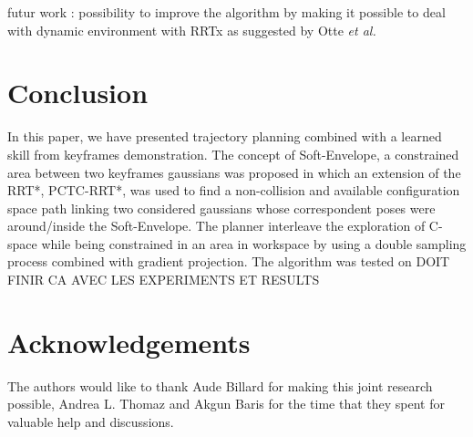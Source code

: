 \documentclass[letterpaper, 10 pt, conference]{ieeeconf}  %
\begin{document}
futur work : possibility to improve the algorithm by making it possible to deal with dynamic environment with RRTx as suggested by Otte \textit{et al.} \cite{RRTx}

\section{Conclusion}
In this paper, we have presented trajectory planning combined with a learned skill from keyframes demonstration. The concept of Soft-Envelope, a constrained area between two keyframes gaussians was proposed in which an extension of the RRT*, PCTC-RRT*, was used to find a non-collision and available configuration space path linking two considered gaussians whose correspondent poses were around/inside the Soft-Envelope. The planner interleave the exploration of C-space while being constrained in an area in workspace by using a double sampling process combined with gradient projection.
The algorithm was tested on  DOIT FINIR CA AVEC LES EXPERIMENTS ET RESULTS

\section{Acknowledgements}
The authors would like to thank Aude Billard for making this joint research possible, Andrea L. Thomaz and Akgun Baris for the time that they spent for valuable help and discussions.


\end{document}
